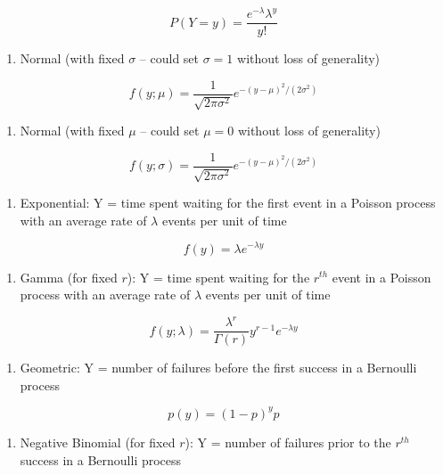 \documentclass[
]{krantz}
\providecommand{\tightlist}{%
  \setlength{\itemsep}{0pt}\setlength{\parskip}{0pt}}
\begin{document}
\[
  P(Y=y)=\frac{e^{-\lambda}\lambda^y}{y!}
  \]

\begin{enumerate}
\def\labelenumi{\alph{enumi})}
\setcounter{enumi}{3}
\tightlist
\item
  Normal (with fixed \(\sigma\) -- could set \(\sigma=1\) without loss of generality)
\end{enumerate}

\[f(y; \mu)=\frac{1}{\sqrt{2\pi\sigma^2}}e^{-{(y-\mu)^2}/{(2\sigma^2)}}\]

\begin{enumerate}
\def\labelenumi{\alph{enumi})}
\setcounter{enumi}{4}
\tightlist
\item
  Normal (with fixed \(\mu\) -- could set \(\mu=0\) without loss of generality)
\end{enumerate}

\[f(y; \sigma)=\frac{1}{\sqrt{2\pi\sigma^2}}e^{-{(y-\mu)^2}/{(2\sigma^2)}}\]

\begin{enumerate}
\def\labelenumi{\alph{enumi})}
\setcounter{enumi}{5}
\tightlist
\item
  Exponential: Y = time spent waiting for the first event in a Poisson process with an average rate of \(\lambda\) events per unit of time
\end{enumerate}

\[f(y)=\lambda e^{-\lambda y}\]

\begin{enumerate}
\def\labelenumi{\alph{enumi})}
\setcounter{enumi}{6}
\tightlist
\item
  Gamma (for fixed \(r\)): Y = time spent waiting for the \(r^{th}\) event in a Poisson process with an average rate of \(\lambda\) events per unit of time
\end{enumerate}

\[f(y; \lambda) = \frac{\lambda^r}{\Gamma(r)} y^{r-1} e^{-\lambda y}\]

\begin{enumerate}
\def\labelenumi{\alph{enumi})}
\setcounter{enumi}{7}
\tightlist
\item
  Geometric: Y = number of failures before the first success in a Bernoulli process
\end{enumerate}

\[p(y)=(1-p)^{y}p\]

\begin{enumerate}
\def\labelenumi{\roman{enumi})}
\tightlist
\item
  Negative Binomial (for fixed \(r\)): Y = number of failures prior to the \(r^{th}\) success in a Bernoulli process
\end{enumerate}
\end{document}
